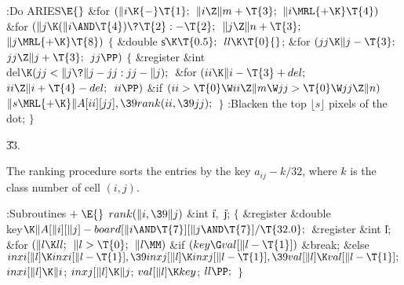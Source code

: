 \Y\B\4:Do ARIES\X${}\E{}$\6
\&{for} ${}(\|i\K{-}\T{1};{}$ ${}\|i\Z\|m+\T{3};{}$ ${}\|i\MRL{+{\K}}\T{4}){}$%
\1\6
\&{for} ${}(\|j\K(\|i\AND\T{4})\?\T{2}:{-}\T{2};{}$ ${}\|j\Z\|n+\T{3};{}$ ${}%
\|j\MRL{+{\K}}\T{8}){}$\5
${}\{{}$\5
\1\&{double} \|s${}\K\T{0.5};{}$\7
${}\\{ll}\K\T{0}{}$;\6
\&{for} ${}(\\{jj}\K\|j-\T{3};{}$ ${}\\{jj}\Z\|j+\T{3};{}$ ${}\\{jj}\PP){}$\5
${}\{{}$\5
\1\&{register} \&{int} \\{del}${}\K(\\{jj}<\|j\?\|j-\\{jj}:\\{jj}-\|j);{}$\7
\&{for} ${}(\\{ii}\K\|i-\T{3}+\\{del};{}$ ${}\\{ii}\Z\|i+\T{4}-\\{del};{}$ ${}%
\\{ii}\PP){}$\1\6
\&{if} ${}(\\{ii}>\T{0}\W\\{ii}\Z\|m\W\\{jj}>\T{0}\W\\{jj}\Z\|n){}$\1\5
${}\|s\MRL{+{\K}}\|A[\\{ii}][\\{jj}],\39\\{rank}(\\{ii},\39\\{jj});{}$\2\2\6
\4${}\}{}$\2\6
:Blacken the top $\lfloor s\rfloor$ pixels of the dot\X;\6
\4${}\}{}$\2\2\par
\U33.\fi

The ranking procedure sorts the entries by the key $a_{ij}-k/32$,
where $k$ is the class number of cell $(i,j)$.

\Y\B\4:Subroutines\X${}\mathrel+\E{}$\6
$\\{rank}(\|i,\39\|j){}$\1\1\6
\&{int} \|i${},{}$ \|j;\2\2\6
${}\{{}$\1\6
\&{register} \&{double} \\{key}${}\K\|A[\|i][\|j]-\\{board}[\|i\AND\T{7}][\|j%
\AND\T{7}]/\T{32.0};{}$\6
\&{register} \&{int} \|l;\7
\&{for} ${}(\|l\K\\{ll};{}$ ${}\|l>\T{0};{}$ ${}\|l\MM){}$\1\6
\&{if} ${}(\\{key}\G\\{val}[\|l-\T{1}]){}$\1\5
\&{break};\2\6
\&{else}\1\5
${}\\{inxi}[\|l]\K\\{inxi}[\|l-\T{1}],\39\\{inxj}[\|l]\K\\{inxj}[\|l-\T{1}],\39%
\\{val}[\|l]\K\\{val}[\|l-\T{1}];{}$\2\2\6
${}\\{inxi}[\|l]\K\|i{}$;\5
${}\\{inxj}[\|l]\K\|j{}$;\5
${}\\{val}[\|l]\K\\{key}{}$;\5
${}\\{ll}\PP;{}$\6
\4${}\}{}$\2\par
\fi

